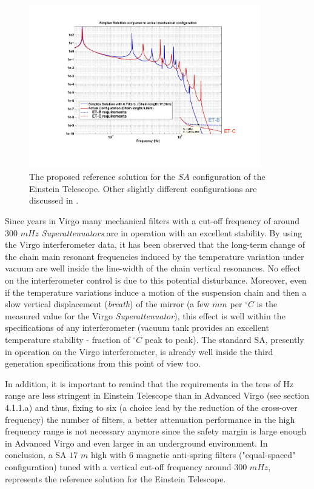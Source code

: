 \begin{figure}[t]
	\begin{center}
		\includegraphics[width=0.9\textwidth]{Detector/SASandSUS/SuspensionSystems/Suspension_Figures/Par4-Fig4.pdf}
			\caption{The proposed reference solution for the $SA$ configuration of the Einstein Telescope. Other slightly different configurations are discussed in \cite{Braccini2010March1-3}.}
\label{Par4Fig4}
	\end{center}
\end{figure}
%
Since years in Virgo many mechanical filters with a cut-off frequency of around $300$ $mHz$ \emph{Superattenuators} are  in operation  with an excellent stability. By using the Virgo interferometer data, it has been observed that the long-term change of the chain main resonant frequencies induced by the temperature variation under vacuum are 
well inside the line-width of the chain vertical resonances. No effect on the interferometer control is due to this potential disturbance. Moreover, even if the temperature variations induce a motion of the suspension chain and then a slow vertical displacement ({\it {breath}}) of the mirror (a few $mm$ per $^{\circ}C$ is the measured 
value for the Virgo \emph{Superattenuator}), this effect is well within the specifications of any interferometer (vacuum tank provides an excellent temperature stability - fraction of $^{\circ}C$ peak to peak).
The standard SA, presently in operation on the Virgo interferometer, is already well inside the third generation specifications from this point of view too.

In addition, it is important to remind that the requirements in the tens of Hz range are less stringent in Einstein Telescope than in Advanced Virgo (see section 4.1.1.a) and thus, fixing to six (a choice lead by the reduction of the cross-over frequency) the number of filters, a better attenuation performance in the high frequency range is not necessary anymore since the safety margin is large enough in Advanced Virgo and even larger in an underground environment. In conclusion, a SA $17$ $m$ high with 6 magnetic anti-spring filters ("equal-spaced" configuration) tuned with a vertical cut-off frequency around 300 $mHz$, represents the reference solution for the Einstein Telescope. 

